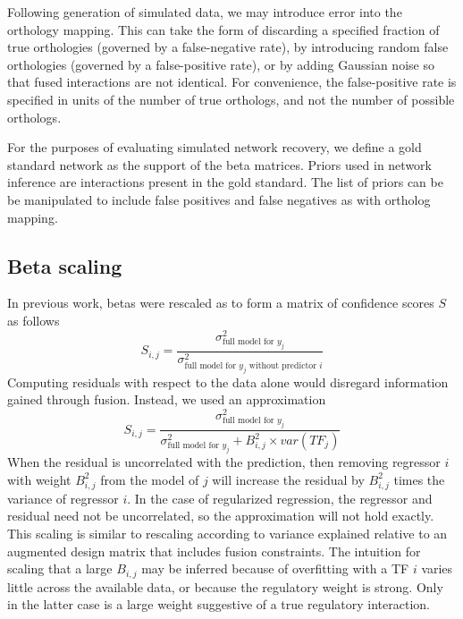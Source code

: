 \documentclass[11pt]{article}
\begin{document}
Following generation of simulated data, we may introduce error into the orthology mapping. This can take the form of discarding a specified fraction of true orthologies (governed by a false-negative rate), by introducing random false orthologies (governed by a false-positive rate), or by adding Gaussian noise so that fused interactions are not identical. For convenience, the false-positive rate is specified in units of the number of true orthologs, and not the number of possible orthologs. 

For the purposes of evaluating simulated network recovery, we define a gold standard network as the support of the beta matrices. Priors used in network inference are interactions present in the gold standard. The list of priors can be be manipulated to include false positives and false negatives as with ortholog mapping. 

\subsection{Beta scaling}
In previous work, betas were rescaled as to form a matrix of confidence scores $S$ as follows
\begin{equation}
S_{i,j} = \frac{\sigma^2_{\text{full model for }y_j}}{\sigma^2_{\text{full model for }y_j \text{ without predictor }i}}
\end{equation}
Computing residuals with respect to the data alone would disregard information gained through fusion. Instead, we used an approximation
\begin{equation}
S_{i,j} = \frac{\sigma^2_{\text{full model for }y_j}}{\sigma^2_{\text{full model for }y_j} + B_{i,j}^2 \times var(TF_j)}
\end{equation}
When the residual is uncorrelated with the prediction, then removing regressor $i$ with weight $B_{i,j}^2$ from the model of $j$ will increase the residual by $B_{i,j}^2$ times the variance of regressor $i$. In the case of regularized regression, the regressor and residual need not be uncorrelated, so the approximation will not hold exactly. This scaling is similar to rescaling according to variance explained relative to an augmented design matrix that includes fusion constraints. The intuition for scaling that a large $B_{i,j}$ may be inferred because of overfitting with a TF $i$ varies little across the available data, or because the regulatory weight is strong. Only in the latter case is a large weight suggestive of a true regulatory interaction.
\end{document}
